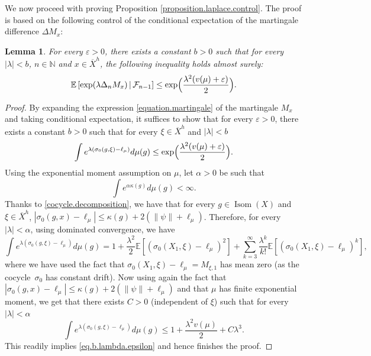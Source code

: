 \documentclass[10pt]{amsart}
\let\epsilon\varepsilon
\theoremstyle{plain}
\newtheorem{lemma}[theorem]{Lemma}
\theoremstyle{definition}
\newcommand\E{\mathbb{E}}
\newcommand\N{\mathbb{N}}
\DeclareMathOperator\Isom{Isom}
\begin{document}
We now proceed with proving Proposition \ref{proposition.laplace.control}. The proof is based on the following control of the conditional expectation of the martingale difference $\Delta M_x$:

\begin{lemma}\label{lemma.martingale.condition}
For every $\epsilon>0$,
there exists a constant $b>0$ such that for every $|\lambda|<b$, $n\in \N$ and $x\in \overline{X}^h$, the following inequality holds almost surely:
\begin{equation*}
\E\left[\exp(\lambda \Delta_n M_x)\,|\,\mathcal{F}_{n-1} \right]
\leq \exp\Bigl(\frac{\lambda^2 (v(\mu)+\epsilon)}{2}\Bigr).
\end{equation*}
\end{lemma}

\begin{proof}
By expanding the expression \eqref{equation.martingale} of the martingale $M_x$ and taking conditional expectation, it suffices to show that for every $\epsilon>0$, there exists a constant $b>0$ such that for every $\xi \in \overline{X}^h$ and $|\lambda|<b$
\begin{equation}\label{eq.b.lambda.epsilon}
\int e^{\lambda(\sigma_0(g,\xi)-\ell_\mu)} d\mu(g) \leq \exp\Bigl(\frac{\lambda^2 (v(\mu)+\epsilon)}{2}\Bigr).
\end{equation}
Using the exponential moment assumption on $\mu$, let $\alpha>0$ be such that
\[
\int e^{\alpha \kappa(g)}d\mu(g)<\infty.
\]
Thanks to \eqref{cocycle.decomposition}, we have that for every $g \in \Isom(X)$ and $\xi \in \overline{X}^h$, $|\sigma_0(g,x)-\ell_\mu| \leq \kappa(g) + 2(\|\psi\|+\ell_\mu)$. Therefore, for every $|\lambda|<\alpha$, using dominated convergence, we have
\[
\int e^{\lambda(\sigma_0(g,\xi)-\ell_\mu)} d\mu(g)=1+\frac{\lambda^2}{2}\E[(\sigma_0(X_1,\xi)-\ell_\mu)^2]+\sum_{k=3}^{\infty}\frac{\lambda^k}{k!}\E[(\sigma_0(X_1,\xi)-\ell_\mu)^k],
\]
where we have used the fact that $\sigma_0(X_1,\xi)\!-\!\ell_\mu\!=\!M_{\xi,1}$ has mean zero (as the cocycle~$\sigma_0$ has constant drift). Now using again the fact that $|\sigma_0(g,x)-\ell_\mu| \leq \kappa(g) + 2(\|\psi\|+\ell_\mu)$ and that $\mu$ has finite exponential moment, we get that there exists $C>0$ (independent of $\xi$) such that for every $|\lambda|<\alpha$
\[
\int e^{\lambda(\sigma_0(g,\xi)-\ell_\mu)} d\mu(g)\leq 1+\frac{\lambda^2 v(\mu)}{2}+ C \lambda^3.
\]
This readily implies \eqref{eq.b.lambda.epsilon} and hence finishes the proof.
\end{proof}
\end{document}
